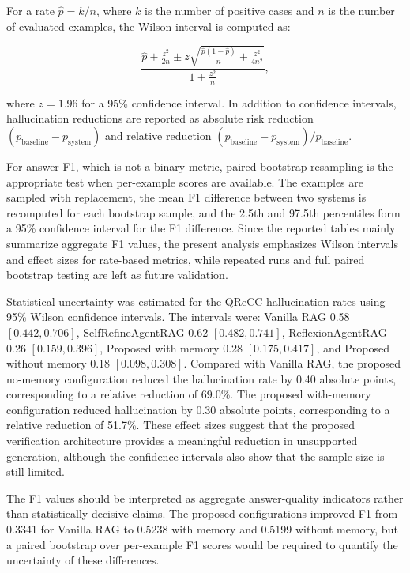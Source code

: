 For a rate \( \hat{p}=k/n \), where \(k\) is the number of positive cases and \(n\) is the number of evaluated examples, the Wilson interval is computed as:

\begin{equation}
\frac{\hat{p} + \frac{z^2}{2n} \pm z
\sqrt{\frac{\hat{p}(1-\hat{p})}{n} + \frac{z^2}{4n^2}}}
{1+\frac{z^2}{n}},
\end{equation}

where \(z=1.96\) for a 95\% confidence interval. In addition to confidence intervals, hallucination reductions are reported as absolute risk reduction \((p_{\text{baseline}}-p_{\text{system}})\) and relative reduction \((p_{\text{baseline}}-p_{\text{system}})/p_{\text{baseline}}\).

For answer F1, which is not a binary metric, paired bootstrap resampling is the appropriate test when per-example scores are available. The examples are sampled with replacement, the mean F1 difference between two systems is recomputed for each bootstrap sample, and the 2.5th and 97.5th percentiles form a 95\% confidence interval for the F1 difference. Since the reported tables mainly summarize aggregate F1 values, the present analysis emphasizes Wilson intervals and effect sizes for rate-based metrics, while repeated runs and full paired bootstrap testing are left as future validation.

Statistical uncertainty was estimated for the QReCC hallucination rates using 95\% Wilson confidence intervals. The intervals were: Vanilla RAG 0.58 \([0.442, 0.706]\), SelfRefineAgentRAG 0.62 \([0.482, 0.741]\), ReflexionAgentRAG 0.26 \([0.159, 0.396]\), Proposed with memory 0.28 \([0.175, 0.417]\), and Proposed without memory 0.18 \([0.098, 0.308]\).
Compared with Vanilla RAG, the proposed no-memory configuration reduced the hallucination rate by 0.40 absolute points, corresponding to a relative reduction of 69.0\%. The proposed with-memory configuration reduced hallucination by 0.30 absolute points, corresponding to a relative reduction of 51.7\%. These effect sizes suggest that the proposed verification architecture provides a meaningful reduction in unsupported generation, although the confidence intervals also show that the sample size is still limited.

The F1 values should be interpreted as aggregate answer-quality indicators rather than statistically decisive claims. The proposed configurations improved F1 from 0.3341 for Vanilla RAG to 0.5238 with memory and 0.5199 without memory, but a paired bootstrap over per-example F1 scores would be required to quantify the uncertainty of these differences.

